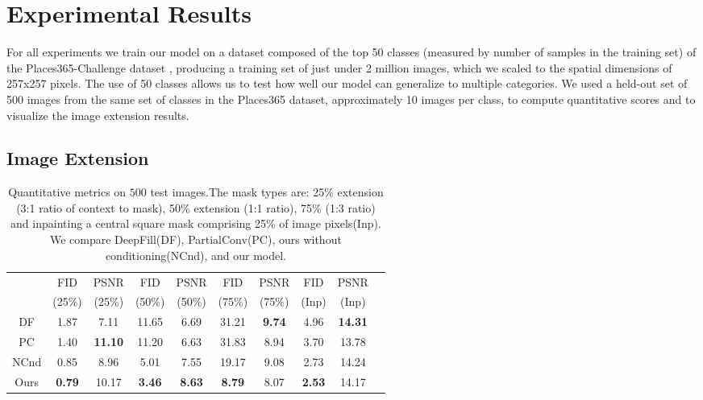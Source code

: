 \section{Experimental Results}
\label{sec:results}
For all experiments we train our model on a dataset composed of the top 50 classes (measured by number of samples in the training set) of the Places365-Challenge dataset \cite{zhou2017places}, producing a training set of just under 2 million images, which we scaled to the spatial dimensions of 257x257 pixels. The use of 50 classes allows us to test how well our model can generalize to multiple categories. We used a held-out set of 500 images from the same set of classes in the Places365 dataset, approximately 10 images per class, to compute quantitative scores and to visualize the image extension results.

\subsection{Image Extension}
\label{subsec:extension}

\begin{table}[tp]
\small
\setlength{\tabcolsep}{2pt}
\centering
\begin{tabular}{|c|c|c|c|c|c|c|c|c|c|}
\hline
  & FID & PSNR & FID & PSNR & FID & PSNR & FID & PSNR\\
& (25\%) & (25\%) & (50\%) & (50\%) & (75\%) & (75\%) & (Inp) & (Inp) \\
\hline
\hline
DF & 1.87 & 7.11 & 11.65 & 6.69 & 31.21 & \textbf{9.74} & 4.96 & \textbf{14.31} \\
PC & 1.40 & \textbf{11.10} & 11.20 & 6.63 & 31.83 & 8.94 & 3.70 & 13.78 \\
NCnd & 0.85 &  8.96 & 5.01 & 7.55 & 19.17 & 9.08 & 2.73 & 14.24 \\
Ours & \textbf{0.79} & 10.17 & \textbf{3.46} & \textbf{8.63} & \textbf{8.79} & 8.07 & \textbf{2.53} & 14.17 \\
\hline
\end{tabular}
\vspace{4pt}
\caption{Quantitative metrics on $500$ test images.The mask types are: 25\% extension (3:1 ratio of context to mask), 50\% extension (1:1 ratio), 75\% (1:3 ratio) and inpainting a central square mask comprising 25\% of image pixels(Inp). We compare DeepFill(DF), PartialConv(PC), ours without conditioning(NCnd), and our model.}
\label{exp:table_all}
\end{table}

